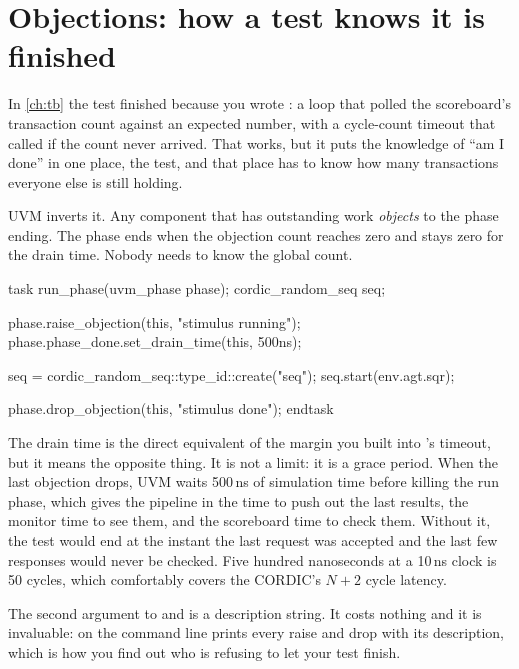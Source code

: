 \section{Objections: how a test knows it is finished}
\label{sec:uvm:objections}

%
In \cref{ch:tb} the test finished because you wrote : a
loop that polled the scoreboard's transaction count against an expected
number, with a cycle-count timeout that called  if the count
never arrived. That works, but it puts the knowledge of ``am I done'' in one
place, the test, and that place has to know how many transactions everyone
else is still holding.

UVM inverts it. Any component that has outstanding work \emph{objects} to the
phase ending. The phase ends when the objection count reaches zero and stays
zero for the drain time. Nobody needs to know the global count.

\begin{uvmcode}[caption={An objection around the stimulus},label={lst:uvm:objection}]
task run_phase(uvm_phase phase);
  cordic_random_seq seq;

  phase.raise_objection(this, "stimulus running");
  phase.phase_done.set_drain_time(this, 500ns);

  seq = cordic_random_seq::type_id::create("seq");
  seq.start(env.agt.sqr);

  phase.drop_objection(this, "stimulus done");
endtask
\end{uvmcode}

%
The drain time is the direct equivalent of the margin you built into
's timeout, but it means the opposite thing. It is not a
limit: it is a grace period. When the last objection drops, UVM waits 500\,ns
of simulation time before killing the run phase, which gives the pipeline in
the \DUT{} time to push out the last results, the monitor time to see them,
and the scoreboard time to check them. Without it, the test would end at the
instant the last request was accepted and the last few responses would never
be checked. Five hundred nanoseconds at a 10\,ns clock is 50 cycles, which
comfortably covers the CORDIC's $N+2$ cycle latency.

The second argument to  and  is
a description string. It costs nothing and it is invaluable:
 on the command line prints every raise and drop
with its description, which is how you find out who is refusing to let your
test finish.

